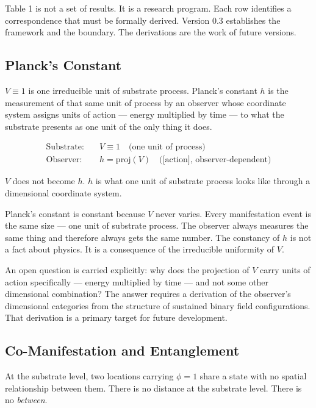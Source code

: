 \documentclass[11pt,letterpaper]{article}
\begin{document}
Table 1 is not a set of results. It is a research program. Each row identifies a correspondence that must be formally derived. Version 0.3 establishes the framework and the boundary. The derivations are the work of future versions.
\subsection{Planck's Constant}
\label{sec:org80726e8}

\(V \equiv 1\) is one irreducible unit of substrate process. Planck's constant \(h\) is the measurement of that same unit of process by an observer whose coordinate system assigns units of action --- energy multiplied by time --- to what the substrate presents as one unit of the only thing it does.

\begin{align}
\text{Substrate:} &\quad V \equiv 1 \quad \text{(one unit of process)} \\
\text{Observer:}  &\quad h = \mathrm{proj}(V) \quad \text{([action], observer-dependent)}
\end{align}

\begin{center}
\(V\) does not become \(h\). \(h\) is what one unit of substrate process looks like through a dimensional coordinate system.
\end{center}

Planck's constant is constant because \(V\) never varies. Every manifestation event is the same size --- one unit of substrate process. The observer always measures the same thing and therefore always gets the same number. The constancy of \(h\) is not a fact about physics. It is a consequence of the irreducible uniformity of \(V\).

An open question is carried explicitly: why does the projection of \(V\) carry units of action specifically --- energy multiplied by time --- and not some other dimensional combination? The answer requires a derivation of the observer's dimensional categories from the structure of sustained binary field configurations. That derivation is a primary target for future development.
\subsection{Co-Manifestation and Entanglement}
\label{sec:org805aaa6}

At the substrate level, two locations carrying \(\phi = 1\) share a state with no spatial relationship between them. There is no distance at the substrate level. There is no \emph{between}.
\end{document}
